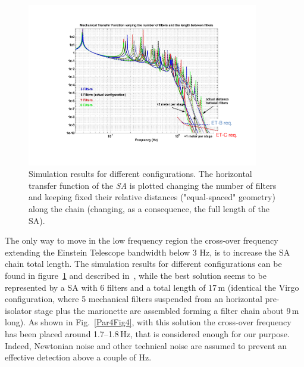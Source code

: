 \begin{figure}[t]
	\begin{center}
		\includegraphics[width=0.9\textwidth]{./Sec_Suspensions/Figures/Par4-Fig3.pdf}
			\caption{Simulation results for different configurations. The horizontal transfer function of the \emph{SA} is plotted changing the number of filters and keeping fixed their relative distances ("equal-spaced" geometry) along the chain (changing, as a consequence, the full length of the SA).}
\label{Par4Fig3}
	\end{center}
\end{figure}
%
The only way to move in the low frequency region the cross-over frequency extending the Einstein Telescope bandwidth below 3 Hz, is to increase the SA chain total length. The simulation results for different configurations can be found in figure~\ref{Par4Fig3} and described in~\cite{Braccini2010March1-3}, while the best solution seems to be represented by a SA with 6 filters and a total length of 17\,m (identical the Virgo configuration, where 5 mechanical filters suspended from an horizontal pre-isolator stage plus the marionette are assembled forming a filter chain about 9\,m long). As shown in Fig.~\ref{Par4Fig4}, with this solution the cross-over frequency has been placed around 1.7--1.8\,Hz, that is considered enough for our purpose. Indeed, Newtonian noise and other technical noise are assumed to prevent an effective detection above a couple of Hz.
%
